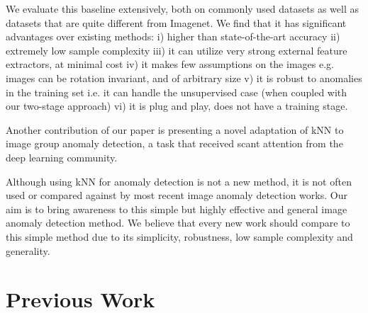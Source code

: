 \documentclass{article}
\begin{document}
We evaluate this baseline extensively, both on commonly used datasets as well as datasets that are quite different from Imagenet. We find that it has significant advantages over existing methods: i) higher than state-of-the-art accuracy ii) extremely low sample complexity iii) it can utilize very strong external feature extractors, at minimal cost iv) it makes few assumptions on the images e.g. images can be rotation invariant, and of arbitrary size v) it is robust to anomalies in the training set i.e. it can handle the unsupervised case (when coupled with our two-stage approach) vi) it is plug and play, does not have a training stage.

Another contribution of our paper is presenting a novel adaptation of kNN to image group anomaly detection, a task that received scant attention from the deep learning community. 

Although using kNN for anomaly detection is not a new method, it is not often used or compared against by most recent image anomaly detection works. Our aim is to bring awareness to this simple but highly effective and general image anomaly detection method. We believe that every new work should compare to this simple method due to its simplicity, robustness, low sample complexity and generality.

\section{Previous Work}
\label{sec:prev}
\end{document}
